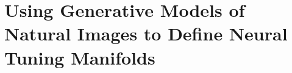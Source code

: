 
\chapter{\color{thesisBlue} Using Generative Models of Natural Images to Define Neural Tuning Manifolds} %

\label{ch:maps} %







